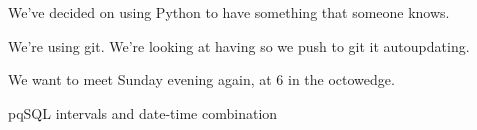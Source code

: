 \documentclass{article}
\title{}
\author{Stephanie Fuller}
\begin{document}
\maketitle

\section{}
We've decided on using Python to have something that someone knows.

We're using git. We're looking at having so we push to git it autoupdating.

We want to meet Sunday evening again, at 6 in the octowedge.  

pqSQL
intervals and date-time combination
\end{document}
